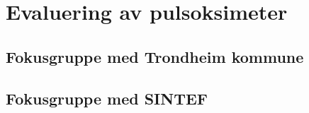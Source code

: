 \chapter{Evaluering av pulsoksimeter}
\label{ch:evaluation1}
\blindtext

\section{Fokusgruppe med Trondheim kommune}
\blindtext
\section{Fokusgruppe med SINTEF}
\blindtext